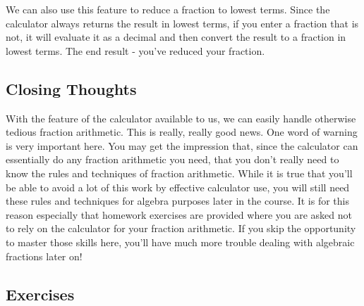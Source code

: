 We can also use this feature to reduce a fraction to lowest terms.  Since the calculator always returns the result in lowest terms, if you enter a fraction that is not, it will evaluate it as a decimal and then convert the result to a fraction in lowest terms.  The end result - you’ve reduced your fraction.



\bigskip

%
%

\subsection{Closing Thoughts}

With the  feature of the calculator available to us, we can easily handle otherwise tedious fraction arithmetic. This is really, really good news. One word of warning is very important here.  You may get the impression that, since the calculator can essentially do any fraction arithmetic you need, that you don’t really need to know the rules and techniques of fraction arithmetic.  While it is true that you’ll be able to avoid a lot of this work by effective calculator use, you will still need these rules and techniques for algebra purposes later in the course.  It is for this reason especially that homework exercises are provided where you are asked not to rely on the calculator for your fraction arithmetic. If you skip the opportunity to master those skills here, you’ll have much more trouble dealing with algebraic fractions later on!

%
%

\clearpage

\subsection{Exercises}

